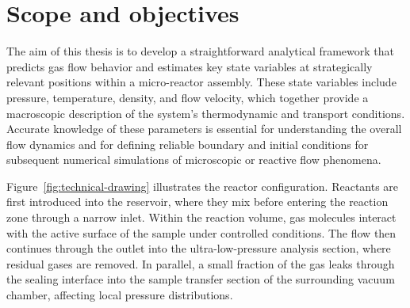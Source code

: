 \section{Scope and objectives}\label{sec:scope-objectives}
	The aim of this thesis is to develop a straightforward analytical framework that predicts gas flow behavior and estimates key state variables at strategically relevant positions within a micro-reactor assembly.  
	These state variables include pressure, temperature, density, and flow velocity, which together provide a macroscopic description of the system's thermodynamic and transport conditions.  
	Accurate knowledge of these parameters is essential for understanding the overall flow dynamics and for defining reliable boundary and initial conditions for subsequent numerical simulations of microscopic or reactive flow phenomena.

	Figure~\ref{fig:technical-drawing} illustrates the reactor configuration. Reactants are first introduced into the reservoir, where they mix before entering the reaction zone through a narrow inlet.  
	Within the reaction volume, gas molecules interact with the active surface of the sample under controlled conditions.  
	The flow then continues through the outlet into the ultra-low-pressure analysis section, where residual gases are removed.  
	In parallel, a small fraction of the gas leaks through the sealing interface into the sample transfer section of the surrounding vacuum chamber, affecting local pressure distributions.

